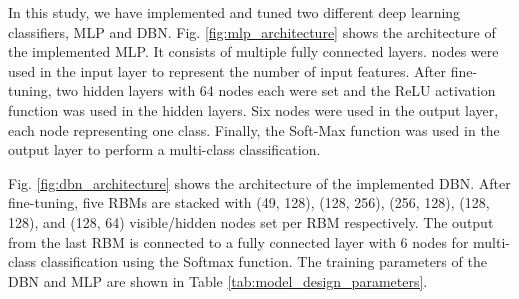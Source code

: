 \documentclass[runningheads]{llncs}
\begin{document}
In this study, we have implemented and tuned two different deep learning classifiers, \ac{MLP} and \ac{DBN}. Fig. \ref{fig:mlp_architecture} shows the architecture of the implemented \ac{MLP}. It consists of multiple fully connected layers.  nodes were used in the input layer to represent the number of input features. After fine-tuning, two hidden layers with 64 nodes each were set and the ReLU activation function was used in the hidden layers. Six nodes were used in the output layer, each node representing one class. Finally, the Soft-Max function was used in the output layer to perform a multi-class classification.

Fig. \ref{fig:dbn_architecture} shows the architecture of the implemented \ac{DBN}. After fine-tuning, five RBMs are stacked with (49, 128), (128, 256), (256, 128), (128, 128), and (128, 64) visible/hidden nodes set per RBM respectively. The output from the last RBM is connected to a fully connected layer with 6 nodes for multi-class classification using the Softmax function. The training parameters of the \ac{DBN} and \ac{MLP} are shown in Table \ref{tab:model_design_parameters}.
\end{document}
